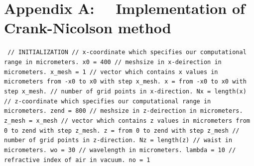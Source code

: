 \documentclass[a4paper]{article}
\begin{document}
	\section*{Appendix A: ~~Implementation of Crank-Nicolson method}
		\texttt{\noindent
			\textcolor{OliveGreen}{// INITIALIZATION\newline\newline
		// x-coordinate which specifies our computational range in micrometers.}\newline
		x0 = 400 \newline
		\textcolor{OliveGreen}{// meshsize in x-deirection in micrometers.}\newline
		x\_mesh = 1 \newline
		\textcolor{OliveGreen}{// vector which contains x values in micrometers from -x0 to x0 with step x\_mesh.}\newline
		x = from -x0 to x0 with step x\_mesh.\newline
		\textcolor{OliveGreen}{// number of grid points in x-direction.}\newline
		Nx = length(x)\newline\newline
		\textcolor{OliveGreen}{// z-coordinate which specifies our computational range in micrometers.}\newline
		zend = 800 \newline
		\textcolor{OliveGreen}{// meshsize in z-deirection in micrometers.}\newline
		z\_mesh = x\_mesh \newline
		\textcolor{OliveGreen}{// vector which contains z values in micrometers from 0 to zend with step z\_mesh.}\newline
		z = from 0 to zend with step z\_mesh\newline
		\textcolor{OliveGreen}{// number of grid points in z-direction.}\newline
		Nz = length(z)\newline
		\textcolor{OliveGreen}{// waist in micrometers.}\newline
		wo = 30 \newline
		\textcolor{OliveGreen}{// wavelength in micrometers.}\newline
		lambda = 10\newline
		\textcolor{OliveGreen}{// refractive index of air in vacuum.}\newline
		no = 1\newline
}
\end{document}
